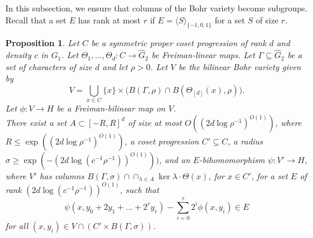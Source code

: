 \documentclass[a4paper,11pt]{article}
\numberwithin{theorem}{section}
\newtheorem{proposition}[theorem]{Proposition}
\theoremstyle{definition}
\newcommand{\on}[1]{
	\operatorname{#1}
}
\begin{document}
In this subsection, we ensure that columns of the Bohr variety become subgroups.\\


Recall that a set $E$ has rank at most $r$ if $E = \langle S\rangle_{\{-1,0,1\}}$ for a set $S$ of size $r$.\\

\begin{proposition}\label{finalExtensionStep2}
    Let $C$ be a symmetric proper coset progression of rank $d$ and density $c$ in $G_1$. Let $\Theta_1, \dots, \Theta_d : C \to \hat{G}_2$ be Freiman-linear maps. Let $\Gamma \subseteq \hat{G}_2$ be a set of characters of size $d$ and let $\rho > 0$. Let $V$ be the bilinear Bohr variety given by
    \begin{equation}\label{detaileddomaindefn}V = \bigcup_{x \in C} \{x\} \times \Big(B(\Gamma, \rho) \cap B(\Theta_{[d]}(x), \rho)\Big).\end{equation}
    Let $\phi : V \to H$ be a Freiman-bilinear map on $V$.\\
    \indent There exist a set $A \subset [-R, R]^d$ of size at most $O((2d \log \rho^{-1})^{O(1)})$, where $R \leq \exp((2d \log \rho^{-1})^{O(1)})$, a coset progression $C' \subseteq C$, a radius $\sigma \geq \exp(-(2d\log(c^{-1}\rho^{-1}))^{O(1)}))$, and an $E$-bihomomorphism $\psi : V' \to H$, where $V'$ has columns $B(\Gamma, \sigma) \cap \cap_{\lambda \in A} \on{ker} \lambda \cdot \Theta(x)$, for $x \in C'$, for a set $E$ of rank $(2d\log(c^{-1}\rho^{-1}))^{O(1)}$, such that 
    \[\psi(x, y_0 + 2y_1 + \dots + 2^r y_r) - \sum_{i = 0}^r 2^i \phi(x, y_i) \in E\]
    for all $(x, y_i) \in V \cap (C' \times B(\Gamma, \sigma))$.
\end{proposition}

\vspace{\baselineskip}
\end{document}
